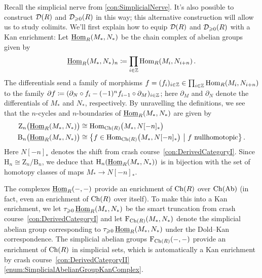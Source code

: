 \begin{numpar}\label{con:DerivedCategoryIII}
	Recall the simplicial nerve from \cref{con:SimplicialNerve}. It's also possible to construct $\mathcal{D}(R)$ and $\mathcal{D}_{\geqslant 0}(R)$ in this way; this alternative construction will allow us to study colimits. We'll first explain how to equip $\mathcal{D}(R)$ and $\mathcal{D}_{\geqslant 0}(R)$ with a Kan enrichment: Let $\operatorname{\underline{Hom}}_R(M_*,N_*)$ be the chain complex of abelian groups given by
	\begin{equation*}
		\operatorname{\underline{Hom}}_R(M_*,N_*)_n\coloneqq\prod_{i\in\mathbb{Z}}\operatorname{Hom}_R(M_i,N_{i+n}) \,.
	\end{equation*}
	The differentials send a family of morphisms $f=(f_i)_{i\in\mathbb{Z}}\in\prod_{i\in\mathbb{Z}}\operatorname{Hom}_R(M_i,N_{i+n})$ to the family $\partial f\coloneqq(\partial_N\circ f_i-(-1)^nf_{i-1}\circ \partial_M)_{i\in\mathbb{Z}}$; here $\partial_M$ and $\partial_N$ denote the differentials of $M_*$ and $N_*$, respectively. By unravelling the definitions, we see that the $n$-cycles and $n$-boundaries of $\operatorname{\underline{Hom}}_R(M_*,N_*)$ are given by
	\begin{align*}
		\mathrm Z_n\bigl(\Hhom_R(M_*,N_*)\bigr)&\cong \Hom_{\Ch(R)}\bigl(M_*,N[-n]_*\bigr)\\
		\mathrm B_n\bigl(\Hhom_R(M_*,N_*)\bigr)&\cong  \left\{f\in\Hom_{\Ch(R)}\bigl(M_*,N[-n]_*\bigr)\ \middle|\ f\text{ nullhomotopic}\right\}\,.
	\end{align*}
	Here $N[-n]_*$ denotes the shift from crash course~\cref{con:DerivedCategoryI}. Since $\mathrm{H}_n\cong \mathrm{Z}_n/\mathrm{B}_n$, we deduce that $\mathrm{H}_n(\operatorname{\underline{Hom}}_R(M_*,N_*))$ is in bijection with the set of homotopy classes of maps $M_*\rightarrow N[-n]_*$.
	
	The complexes $\operatorname{\underline{Hom}}_R(-,-)$ provide an enrichment of $\operatorname{Ch}(R)$ over $\operatorname{Ch}(\mathrm{Ab})$ (in fact, even an enrichment of $\operatorname{Ch}(R)$ over itself). To make this into a Kan enrichment, we let $\tau_{\geqslant 0}\operatorname{\underline{Hom}}_R(M_*,N_*)$ be the smart truncation from crash course~\cref{con:DerivedCategoryI} and let $\operatorname{F}_{\operatorname{Ch}(R)}(M_*,N_*)$ denote the simplicial abelian group corresponding to $\tau_{\geqslant0}\operatorname{\underline{Hom}}_R(M_*,N_*)$ under the Dold--Kan correspondence. The simplicial abelian groups $\operatorname{F}_{\operatorname{Ch}(R)}(-,-)$ provide an enrichment of $\operatorname{Ch}(R)$ in simplicial sets, which is automatically a Kan enrichment by crash course~\cref{con:DerivedCategoryII}\cref{enum:SimplicialAbelianGroupKanComplex}.
	

\end{numpar}
